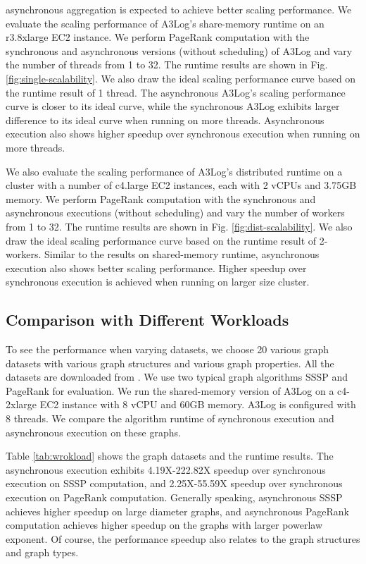 asynchronous aggregation is expected to achieve better scaling performance. We evaluate the scaling performance of A3Log's share-memory runtime on an r3.8xlarge EC2 instance. We perform PageRank computation with the synchronous and asynchronous versions (without scheduling) of A3Log and vary the number of threads from 1 to 32. The runtime results are shown in Fig.\ref{fig:single-scalability}. We also draw the ideal scaling performance curve based on the runtime result of 1 thread. The asynchronous A3Log's scaling performance curve is closer to its ideal curve, while the synchronous A3Log exhibits larger difference to its ideal curve when running on more threads. Asynchronous execution also shows higher speedup over synchronous execution when running on more threads.

 We also evaluate the scaling performance of A3Log's distributed runtime on a cluster with a number of c4.large EC2 instances, each with 2 vCPUs and 3.75GB memory. We perform PageRank computation with the synchronous and asynchronous executions (without scheduling) and vary the number of workers from 1 to 32. The runtime results are shown in Fig. \ref{fig:dist-scalability}. We also draw the ideal scaling performance curve based on the runtime result of 2-workers. Similar to the results on shared-memory runtime, asynchronous execution also shows better scaling performance. Higher speedup over synchronous execution is achieved when running on larger size cluster.


\subsection{Comparison with Different Workloads}
\label{sec:expr:workloads}
To see the performance when varying datasets, we choose 20 various graph datasets with various graph structures and various graph properties. All the datasets are downloaded from \cite{konect}. We use two typical graph algorithms SSSP and PageRank for evaluation. We run the shared-memory version of A3Log on a c4-2xlarge EC2 instance with 8 vCPU and 60GB memory. A3Log is configured with 8 threads. We compare the algorithm runtime of synchronous execution and asynchronous execution on these graphs.

Table \ref{tab:wrokload} shows the graph datasets and the runtime results. The asynchronous execution exhibits 4.19X-222.82X speedup over synchronous execution on SSSP computation, and 2.25X-55.59X speedup over synchronous execution on PageRank computation. Generally speaking, asynchronous SSSP achieves higher speedup on large diameter graphs, and asynchronous PageRank computation achieves higher speedup on the graphs with larger powerlaw exponent. Of course, the performance speedup also relates to the graph structures and graph types. %

